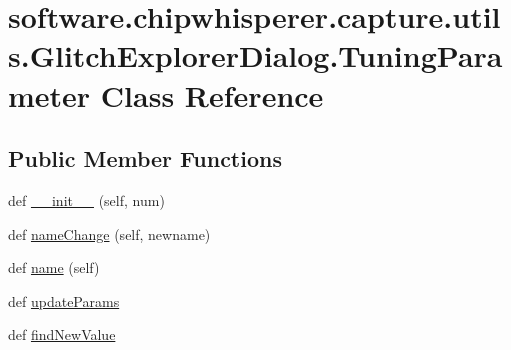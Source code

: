 \hypertarget{classsoftware_1_1chipwhisperer_1_1capture_1_1utils_1_1GlitchExplorerDialog_1_1TuningParameter}{}\section{software.\+chipwhisperer.\+capture.\+utils.\+Glitch\+Explorer\+Dialog.\+Tuning\+Parameter Class Reference}
\label{classsoftware_1_1chipwhisperer_1_1capture_1_1utils_1_1GlitchExplorerDialog_1_1TuningParameter}
\subsection*{Public Member Functions}
\begin{DoxyCompactItemize}
\item 
def \hyperlink{classsoftware_1_1chipwhisperer_1_1capture_1_1utils_1_1GlitchExplorerDialog_1_1TuningParameter_a3e5247fb0a55efe6ad1b981668b0b214}{\+\_\+\+\_\+init\+\_\+\+\_\+} (self, num)
\item 
def \hyperlink{classsoftware_1_1chipwhisperer_1_1capture_1_1utils_1_1GlitchExplorerDialog_1_1TuningParameter_accae129b1f9e7e2f7f7246e2ef9560fe}{name\+Change} (self, newname)
\item 
def \hyperlink{classsoftware_1_1chipwhisperer_1_1capture_1_1utils_1_1GlitchExplorerDialog_1_1TuningParameter_a28cb5e10cffe712a2836c7f8baafc37c}{name} (self)
\item 
def \hyperlink{classsoftware_1_1chipwhisperer_1_1capture_1_1utils_1_1GlitchExplorerDialog_1_1TuningParameter_a5c70a74b2dcc86730bf403b5e8d17f64}{update\+Params}
\item 
def \hyperlink{classsoftware_1_1chipwhisperer_1_1capture_1_1utils_1_1GlitchExplorerDialog_1_1TuningParameter_a82c0caf8a16e6de75b403254d7013878}{find\+New\+Value}
\end{DoxyCompactItemize}
